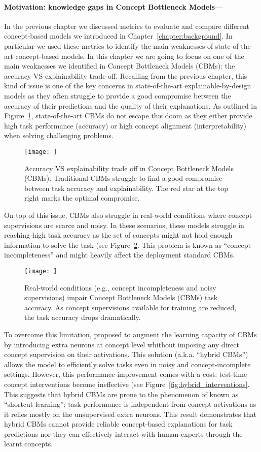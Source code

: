 \documentclass[withindex,glossary]{cam-thesis}
\theoremstyle{plain}
\theoremstyle{definition}
\theoremstyle{remark}
\begin{document}
\paragraph{Motivation: knowledge gaps in Concept Bottleneck Models---}
In the previous chapter we discussed metrics to evaluate and compare different concept-based models we introduced in Chapter~\ref{chapter:background}. In particular we used these metrics to identify the main weaknesses of state-of-the-art concept-based models. In this chapter we are going to focus on one of the main weaknesses we identified in Concept Bottleneck Models (CBMs): the accuracy VS explainability trade off. Recalling from the previous chapter, this kind of issue is one of the key concerns in state-of-the-art explainable-by-design models as they often struggle to provide a good compromise between the accuracy of their predictions and the quality of their explanations. As outlined in Figure~\ref{fig:cbm_tradeoff}, state-of-the-art CBMs do not escape this doom as they either provide high task performance (accuracy) or high concept alignment (interpretability) when solving challenging problems.
\begin{figure}[h]
\texttt{[image: ]}
\caption{Accuracy VS explainability trade off in Concept Bottleneck Models (CBMs). Traditional CBMs struggle to find a good compromise between task accuracy and explainability. The red star at the top right marks the optimal compromise.}
\label{fig:cbm_tradeoff}
\end{figure}
On top of this issue, CBMs also struggle in real-world conditions where concept supervisions are scarce and noisy. In these scenarios, these models struggle in reaching high task accuracy as the set of concepts might not hold enough information to solve the task (see Figure~\ref{fig:cbm_real_world}. This problem is known as ``concept incompleteness'' and might heavily affect the deployment standard CBMs.
\begin{figure}[h]
\texttt{[image: ]}
\caption{Real-world conditions (e.g., concept incompleteness and noisy supervisions) impair Concept Bottleneck Models (CBMs) task accuracy. As concept supervisions available for training are reduced, the task accuracy drops dramatically.}
\label{fig:cbm_real_world}
\end{figure}
To overcome this limitation, \citet{mahinpei2021promises} proposed to augment the learning capacity of CBMs by introducing extra neurons at concept level whithout imposing any direct concept supervision on their activations. This solution (a.k.a. ``hybrid CBMs'') allows the model to efficiently solve tasks even in noisy and concept-incomplete settings. However, this performance improvement comes with a cost: test-time concept interventions become ineffective (see Figure~\ref{fig:hybrid_interventions}. This suggests that hybrid CBMs are prone to the phenomenon of known as ``shortcut learning'': task performance is independent from concept activations as it relies mostly on the unsupervised extra neurons. This result demonstrates that hybrid CBMs cannot provide reliable concept-based explanations for task predictions nor they can effectively interact with human experts through the learnt concepts.
\end{document}
